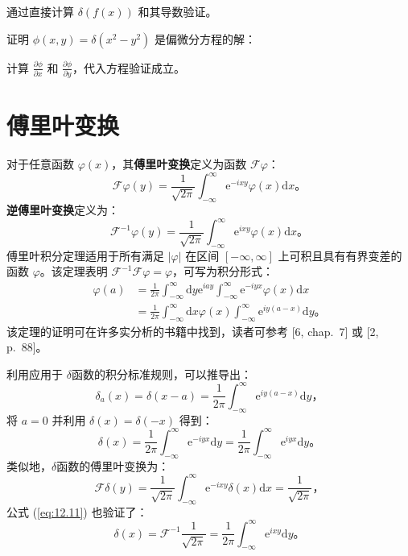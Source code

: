 通过直接计算 $\delta(f(x))$ 和其导数验证。

证明 $\phi(x, y) = \delta(x^2 - y^2)$ 是偏微分方程的解：

计算 $\frac{\partial \phi}{\partial x}$ 和
$\frac{\partial \phi}{\partial y}$，代入方程验证成立。

\section{傅里叶变换}\label{12.3}

对于任意函数 $\varphi(x)$，其\textbf{傅里叶变换}定义为函数
$\mathcal{F} \varphi$：
 $$
\mathcal{F} \varphi(y)=\frac{1}{\sqrt{2 \pi}} \int_{-\infty}^\infty \mathrm{e}^{-i x y} \varphi(x) \mathrm{d}x。
$$
\textbf{逆傅里叶变换}定义为：
 $$
\mathcal{F}^{-1} \varphi(y)=\frac{1}{\sqrt{2 \pi}} \int_{-\infty}^\infty \mathrm{e}^{i x y} \varphi(x) \mathrm{d}x。
$$
傅里叶积分定理适用于所有满足 $|\varphi|$ 在区间 $[-\infty, \infty]$
上可积且具有有界变差的函数 $\varphi$。该定理表明
$\mathcal{F}^{-1} \mathcal{F} \varphi=\varphi$，可写为积分形式：
 $$
\begin{aligned}
\varphi(a) & =\frac{1}{2 \pi} \int_{-\infty}^\infty \mathrm{d}y \mathrm{e}^{i a y} \int_{-\infty}^\infty \mathrm{e}^{-i y x} \varphi(x) \mathrm{d}x \\
& =\frac{1}{2 \pi} \int_{-\infty}^\infty \mathrm{d}x \varphi(x) \int_{-\infty}^\infty \mathrm{e}^{i y(a-x)} \mathrm{d}y。
\end{aligned}
$$
该定理的证明可在许多实分析的书籍中找到，读者可参考 {[}6, chap.~7{]} 或
{[}2, p.~88{]}。

利用应用于 $\delta$函数的积分标准规则，可以推导出：
\begin{equation}\label{eq:12.10} 
 \delta_a(x) = \delta(x-a) = \frac{1}{2 \pi} \int_{-\infty}^\infty \mathrm{e}^{i y(a-x)} \mathrm{d}y， 
 \end{equation}
将 $a=0$ 并利用 $\delta(x)=\delta(-x)$ 得到：
\begin{equation}\label{eq:12.11} 
 \delta(x)=\frac{1}{2 \pi} \int_{-\infty}^\infty \mathrm{e}^{-i y x} \mathrm{d}y = \frac{1}{2 \pi} \int_{-\infty}^\infty \mathrm{e}^{i y x} \mathrm{d}y。 
 \end{equation}
类似地，$\delta$函数的傅里叶变换为：
\begin{equation}\label{eq:12.12} 
 \mathcal{F} \delta(y)=\frac{1}{\sqrt{2 \pi}} \int_{-\infty}^\infty \mathrm{e}^{-i x y} \delta(x) \mathrm{d}x = \frac{1}{\sqrt{2 \pi}}， 
 \end{equation}
公式 (\ref{eq:12.11}) 也验证了：
\begin{equation}\label{eq:12.13} 
 \delta(x) = \mathcal{F}^{-1} \frac{1}{\sqrt{2 \pi}} = \frac{1}{2 \pi} \int_{-\infty}^\infty \mathrm{e}^{i x y} \mathrm{d}y。 
 \end{equation}

